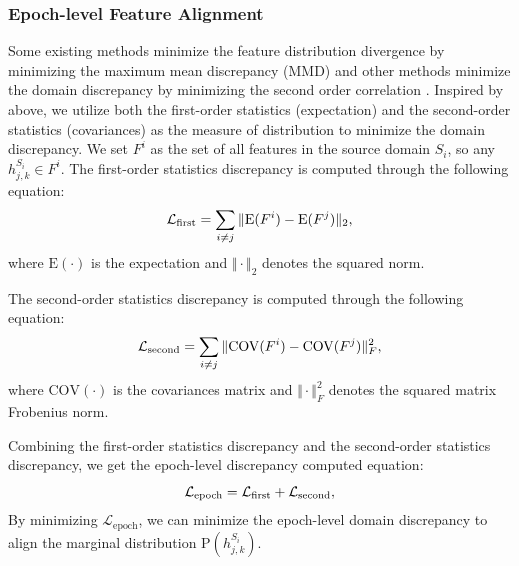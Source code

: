 \documentclass[letterpaper]{article} %
\begin{document}
	\subsubsection{Epoch-level Feature Alignment}
	Some existing methods minimize the feature distribution divergence by minimizing the maximum mean discrepancy (MMD) \citep{tzeng2014deep, wang2018visual, wang2020transfer} and other methods minimize the domain discrepancy by minimizing the second order correlation \citep{sun2016return, sun2016deep}.
	Inspired by above, we utilize both the first-order statistics (expectation) and the second-order statistics (covariances) as the measure of distribution to minimize the domain discrepancy.
	We set $F^i$ as the set of all features in the source domain $S_i$, so any $h^{S_i}_{j, k} \in F^i$.
	The first-order statistics discrepancy is computed through the following equation:
	\begin{equation}
		\label{eq:first}
		\small
		\mathcal{L}_{\mathrm{first}} = \sum_{i \neq j}\Vert \mathrm{E}(F^i) - \mathrm{E}(F^j) \Vert_2,
	\end{equation}
	where $\mathrm{E}(\cdot)$ is the expectation and $\Vert \cdot \Vert_2$ denotes the squared norm.

	The second-order statistics discrepancy is computed through the following equation:
	\begin{equation}
		\label{eq:second}
		\small
		\mathcal{L}_{\mathrm{second}} = \sum_{i \neq j}\Vert \mathrm{COV}(F^i) - \mathrm{COV}(F^j) \Vert^2_F,
	\end{equation}
	where $\mathrm{COV}(\cdot)$ is the covariances matrix and $\Vert \cdot \Vert^2_F$ denotes the squared matrix Frobenius norm.

	Combining the first-order statistics discrepancy and the second-order statistics discrepancy, we get the epoch-level discrepancy computed equation:
	\begin{equation}
		\label{eq:epoch}
		\small
		\mathcal{L}_{\mathrm{epoch}} = \mathcal{L}_{\mathrm{first}} + \mathcal{L}_{\mathrm{second}},
	\end{equation}
	By minimizing $\mathcal{L}_{\mathrm{epoch}}$, we can minimize the epoch-level domain discrepancy to align the marginal distribution  $\mathrm{P}(h^{S_i}_{j, k})$.
\end{document}
